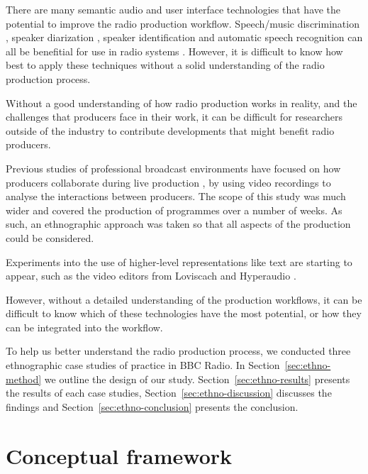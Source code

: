 
There are many semantic audio and user interface technologies that have the potential to improve the radio production
workflow. Speech/music discrimination \citep{Wieser2014}, speaker diarization \citep{AngueraMiro2012}, speaker
identification \citep{Lee1999a} and automatic speech recognition \citep{Junqua1995} can all be benefitial for use in
radio systems \citep{Raimond2014,Bell2015}. However, it is difficult to know how best to apply these techniques without
a solid understanding of the radio production process.

Without a good understanding of how radio production works in reality, and the challenges that producers face in their
work, it can be difficult for researchers outside of the industry to contribute developments that might benefit radio
producers.

Previous studies of professional broadcast environments have focused on how producers collaborate during live
production \citep{Engstroem2010,Perry2009}, by using video recordings to analyse the interactions between producers.
The scope of this study was much wider and covered the production of programmes over a number of weeks. As such, an
ethnographic approach was taken so that all aspects of the production could be considered.

Experiments into the use of higher-level representations like text are starting to appear, such as the video editors
from Loviscach \citep{Loviscach2011a} and Hyperaudio \citep{Boas2011}.

However, without a detailed understanding of the production workflows, it can be difficult to know which of these
technologies have the most potential, or how they can be integrated into the workflow.

To help us better understand the radio production process, we conducted three ethnographic case studies of practice in
BBC Radio.
In Section~\ref{sec:ethno-method} we outline the design of our study.
Section~\ref{sec:ethno-results} presents the results of each case studies,
Section~\ref{sec:ethno-discussion} discusses the findings and
Section~\ref{sec:ethno-conclusion} presents the conclusion.

\section{Conceptual framework}\label{sec:ethno-framework}

